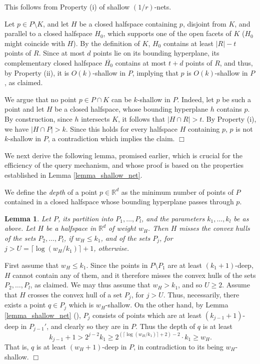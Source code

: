 \documentclass[11pt]{article}
\newtheorem{lemma}[theorem]{Lemma}
\def\reals{\mathbb R}
\def\ol#1{\overline{#1}}
\begin{document}
 This follows from Property (i) of shallow $(1/r)$-nets.

 Let $p \in P \setminus K$, and let $H$ be a closed halfspace containing $p$, disjoint from $K$, and parallel to a closed halfspace $H_{0}$, which supports one of the open facets of $K$ ($H_{0}$ might coincide with $H$). By the definition of $K$, $H_{0}$ contains at least $|R| - t$ points of $R$. Since at most $d$ points lie on its bounding hyperplane, its  complementary closed halfspace $\ol{H_{0}}$ contains at most $t + d$ points of $R$, and thus, by Property (ii), it is $O(k)$-shallow in $P$, implying that $p$ is $O(k)$-shallow in $P$, as claimed.

 We argue that no point $p \in P \cap K$ can be $k$-shallow in $P$. Indeed, let $p$ be such a point and let $H$ be a closed halfspace, whose bounding hyperplane $h$ contains $p$. By construction, since $h$ intersects $K$, it follows that $|H \cap R| > t$. By Property (i), we have $|H \cap P| > k$. Since this holds for every halfspace $H$ containing $p$, $p$ is not $k$-shallow in $P$, a contradiction which implies the claim. $\Box$

We next derive the following lemma, promised earlier, which is crucial for the efficiency of the query mechanism, and whose proof is based on the properties established in Lemma \ref{lemma_shallow_net}.

We define the {\em depth} of a point $p \in \reals^{d}$ as the minimum number of points of $P$ contained in a closed halfspace whose bounding hyperplane passes through $p$.

\begin{lemma} \label{lemma_missing_Pj}
Let $P$, its partition into $P_{1}, \ldots, P_{l}$, and the parameters $k_{1}, \ldots, k_{l}$ be as above. Let $H$ be a halfspace in $\reals^{d}$ of weight $w_{H}$. Then $H$ misses the convex hulls of the sets $P_{2}, \ldots, P_{l}$, if $w_{H} \leq k_{1}$, and of the sets $P_{j}$, for $j > U = \lceil \log (w_{H}/k_{1}) \rceil + 1$, otherwise.
\end{lemma}

First assume that $w_{H} \leq k_{1}$. Since the points in $P \setminus P_{1}$ are at least $(k_{1} + 1)$-deep, $H$ cannot contain any of them, and it therefore misses the convex hulls of the sets $P_{2}, \ldots ,P_{l}$, as claimed. We may thus assume that $w_{H} > k_{1}$, and so $U \geq 2$. Assume that $H$ crosses the convex hull of a set $P_{j}$, for $j > U$. Thus, necessarily, there exists a point $q \in P_{j}$ which is $w_{H}$-shallow. On the other hand, by Lemma \ref{lemma_shallow_net} ({}), $P_{j}$ consists of points which are at least $(k_{j-1}+1)$-deep in $P_{j-1}'$, and clearly so they are in $P$. Thus the depth of $q$ is at least
$$
k_{j-1}+1 > 2^{j-2}k_{1} \geq 2^{(\lceil \log (w_{H}/k_{1}) \rceil + 2) - 2} \cdot k_{1} \geq w_{H}.
$$
That is, $q$ is at least $(w_{H}+1)$-deep in $P$, in contradiction to its being $w_{H}$-shallow. $\Box$
\end{document}
